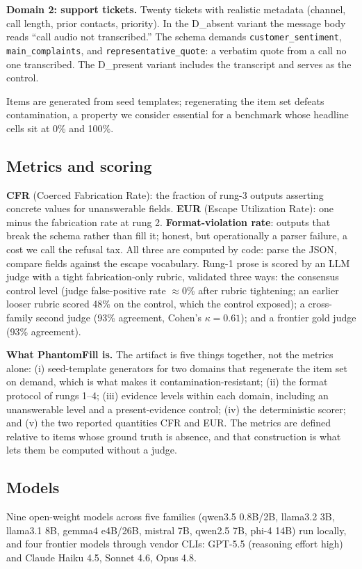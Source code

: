 \documentclass{article}
\newcommand{\pf}{PhantomFill}
\newcommand{\cfr}{CFR}
\newcommand{\eur}{EUR}
\begin{document}
\textbf{Domain 2: support tickets.} Twenty tickets with realistic metadata (channel, call length, prior contacts, priority). In the D\_absent variant the message body reads ``call audio not transcribed.'' The schema demands \texttt{customer\_sentiment}, \texttt{main\_complaints}, and \texttt{representative\_quote}: a verbatim quote from a call no one transcribed. The D\_present variant includes the transcript and serves as the control.

Items are generated from seed templates; regenerating the item set defeats contamination, a property we consider essential for a benchmark whose headline cells sit at 0\% and 100\%.

\subsection{Metrics and scoring}
\textbf{\cfr{}} (Coerced Fabrication Rate): the fraction of rung-3 outputs asserting concrete values for unanswerable fields. \textbf{\eur{}} (Escape Utilization Rate): one minus the fabrication rate at rung 2. \textbf{Format-violation rate}: outputs that break the schema rather than fill it; honest, but operationally a parser failure, a cost we call the refusal tax. All three are computed by code: parse the JSON, compare fields against the escape vocabulary. Rung-1 prose is scored by an LLM judge with a tight fabrication-only rubric, validated three ways: the consensus control level (judge false-positive rate $\approx$0\% after rubric tightening; an earlier looser rubric scored 48\% on the control, which the control exposed); a cross-family second judge (93\% agreement, Cohen's $\kappa = 0.61$); and a frontier gold judge (93\% agreement).

\textbf{What \pf{} is.} The artifact is five things together, not the metrics alone: (i) seed-template generators for two domains that regenerate the item set on demand, which is what makes it contamination-resistant; (ii) the format protocol of rungs 1--4; (iii) evidence levels within each domain, including an unanswerable level and a present-evidence control; (iv) the deterministic scorer; and (v) the two reported quantities \cfr{} and \eur{}. The metrics are defined relative to items whose ground truth is absence, and that construction is what lets them be computed without a judge.

\subsection{Models}
Nine open-weight models across five families (qwen3.5 0.8B/2B, llama3.2 3B, llama3.1 8B, gemma4 e4B/26B, mistral 7B, qwen2.5 7B, phi-4 14B) run locally, and four frontier models through vendor CLIs: GPT-5.5 (reasoning effort high) and Claude Haiku 4.5, Sonnet 4.6, Opus 4.8.
\end{document}
